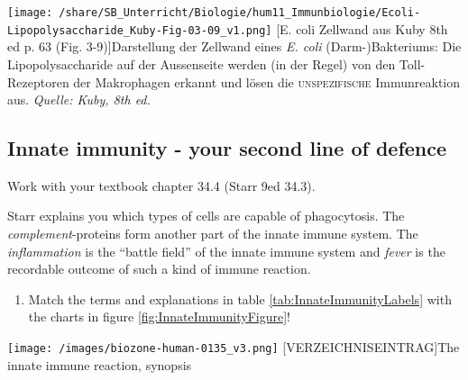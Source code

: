 		\begin{minipage}{15.5cm}\centering
		  \texttt{[image: /share/SB\_Unterricht/Biologie/hum11\_Immunbiologie/Ecoli-Lipopolysaccharide\_Kuby-Fig-03-09\_v1.png]}
		  [E. coli Zellwand aus Kuby 8th ed p. 63 (Fig. 3-9)]{Darstellung der Zellwand eines \textit{E. coli} (Darm-)Bakteriums: Die Lipopolysaccharide auf der Aussenseite werden (in der Regel) von den Toll-Rezeptoren der Makrophagen erkannt und lösen die \textsc{unspezifische} Immunreaktion aus. \textit{Quelle: Kuby, 8th ed.}}
		  \label{fig:BakterienZellwand}
		\end{minipage}

\subsection{Innate immunity - your second line of defence}\label{sec:ImmuneInnate}\label{ssc:ImmuneInnate}
Work with your textbook  chapter 34.4 (Starr 9ed 34.3).

		\begin{mdframed}[style=exampledefault, userdefinedwidth=12cm,frametitle={Starr chapter 34.3}\label{mat:BEISPIELMATERIAL}]
			Starr explains you which types of cells are capable of phagocytosis. The \emph{complement}-proteins form another part of the innate immune system. The \emph{inflammation} is the ``battle field'' of the innate immune system and \emph{fever} is the recordable outcome of such a kind of immune reaction.
		\end{mdframed}

	\begin{enumerate}[itemsep=1.5em, resume, leftmargin=*]
	\item  Match the terms and explanations in table \ref{tab:InnateImmunityLabels} with the charts in figure \ref{fig:InnateImmunityFigure}!
	\end{enumerate}

				\begin{addmargin*}[-2cm]{-2cm}
	 \begin{minipage}{16cm}
		  \texttt{[image: /images/biozone-human-0135\_v3.png]}
		  [VERZEICHNISEINTRAG]{The innate immune reaction, synopsis}
		  \label{fig:InnateImmunityFigure}
	 \end{minipage}
				\end{addmargin*}


